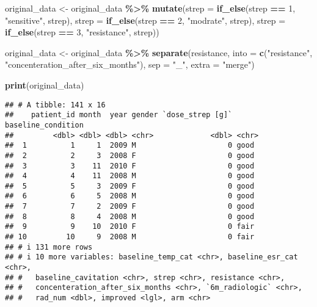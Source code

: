 \documentclass[
]{article}
\newenvironment{Shaded}{\begin{snugshade}}{\end{snugshade}}
\newcommand{\AttributeTok}[1]{\textcolor[rgb]{0.13,0.29,0.53}{#1}}
\newcommand{\DecValTok}[1]{\textcolor[rgb]{0.00,0.00,0.81}{#1}}
\newcommand{\FunctionTok}[1]{\textcolor[rgb]{0.13,0.29,0.53}{\textbf{#1}}}
\newcommand{\NormalTok}[1]{#1}
\newcommand{\OtherTok}[1]{\textcolor[rgb]{0.56,0.35,0.01}{#1}}
\newcommand{\SpecialCharTok}[1]{\textcolor[rgb]{0.81,0.36,0.00}{\textbf{#1}}}
\newcommand{\StringTok}[1]{\textcolor[rgb]{0.31,0.60,0.02}{#1}}
\begin{document}
\begin{Shaded}
\begin{Highlighting}[]
\NormalTok{original\_data }\OtherTok{\textless{}{-}}\NormalTok{ original\_data }\SpecialCharTok{\%\textgreater{}\%} 
  \FunctionTok{mutate}\NormalTok{(}\AttributeTok{strep =} \FunctionTok{if\_else}\NormalTok{(strep }\SpecialCharTok{==} \DecValTok{1}\NormalTok{, }\StringTok{"sensitive"}\NormalTok{, strep),}
         \AttributeTok{strep =} \FunctionTok{if\_else}\NormalTok{(strep }\SpecialCharTok{==} \DecValTok{2}\NormalTok{, }\StringTok{"modrate"}\NormalTok{, strep),}
         \AttributeTok{strep =} \FunctionTok{if\_else}\NormalTok{(strep }\SpecialCharTok{==} \DecValTok{3}\NormalTok{, }\StringTok{"resistance"}\NormalTok{, strep))}

\NormalTok{original\_data }\OtherTok{\textless{}{-}}\NormalTok{ original\_data }\SpecialCharTok{\%\textgreater{}\%}
  \FunctionTok{separate}\NormalTok{(resistance, }\AttributeTok{into =} \FunctionTok{c}\NormalTok{(}\StringTok{"resistance"}\NormalTok{, }\StringTok{"concenteration\_after\_six\_months"}\NormalTok{), }\AttributeTok{sep =} \StringTok{"\_"}\NormalTok{, }\AttributeTok{extra =} \StringTok{"merge"}\NormalTok{)}

\FunctionTok{print}\NormalTok{(original\_data)}
\end{Highlighting}
\end{Shaded}

\begin{verbatim}
## # A tibble: 141 x 16
##    patient_id month  year gender `dose_strep [g]` baseline_condition
##         <dbl> <dbl> <dbl> <chr>             <dbl> <chr>             
##  1          1     1  2009 M                     0 good              
##  2          2     3  2008 F                     0 good              
##  3          3    11  2010 F                     0 good              
##  4          4    11  2008 M                     0 good              
##  5          5     3  2009 F                     0 good              
##  6          6     5  2008 M                     0 good              
##  7          7     2  2009 F                     0 good              
##  8          8     4  2008 M                     0 good              
##  9          9    10  2010 F                     0 fair              
## 10         10     9  2008 M                     0 fair              
## # i 131 more rows
## # i 10 more variables: baseline_temp_cat <chr>, baseline_esr_cat <chr>,
## #   baseline_cavitation <chr>, strep <chr>, resistance <chr>,
## #   concenteration_after_six_months <chr>, `6m_radiologic` <chr>,
## #   rad_num <dbl>, improved <lgl>, arm <chr>
\end{verbatim}
\end{document}
